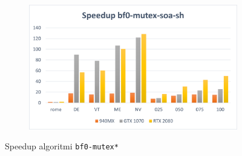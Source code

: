 \documentclass[12pt,a4paper]{book}
\begin{document}
\begin{figure}[b]
\begin{subfigure}{.5\textwidth}
		\end{subfigure}%
		\begin{subfigure}{.5\textwidth}
			\centering
			\includegraphics[width=\textwidth]{speedup_bf0-mutex-soa-sh}
		\end{subfigure}
		\caption{Speedup algoritmi \texttt{bf0-mutex*}}
		\label{fig:speedup_bf0-mutex}
	\end{figure}
\end{document}
